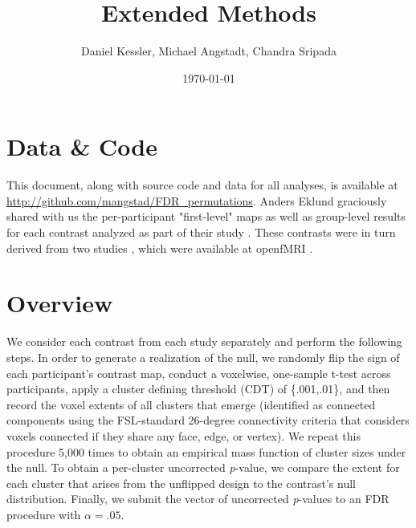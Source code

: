 \documentclass{article}
\author{Daniel Kessler, Michael Angstadt, Chandra Sripada}
\date{\today}
\title{Extended Methods}
\begin{document}
\maketitle

\section{Data \& Code}
This document, along with source code and data for all analyses, is available at \url{http://github.com/mangstad/FDR_permutations}.
Anders Eklund graciously shared with us the per-participant "first-level" maps as well as group-level results for each contrast analyzed as part of their study  \cite{eklund_cluster_2016}.
These contrasts were in turn derived from two studies \cite{duncan_consistency_2009,tom_neural_2007}, which were available at openfMRI \cite{poldrack_toward_2013}.


\section{Overview}
We consider each contrast from each study separately and perform the following steps.
In order to generate a realization of the null, we randomly flip the sign of each participant's contrast map, conduct a voxelwise, one-sample t-test across participants, apply a cluster defining threshold (CDT) of \{.001,.01\}, and then record the voxel extents of all clusters that emerge (identified as connected components using the FSL-standard 26-degree connectivity criteria that considers voxels connected if they share any face, edge, or vertex).
We repeat this procedure 5,000 times to obtain an empirical mass function of cluster sizes under the null.
To obtain a per-cluster uncorrected \textit{p}-value, we compare the extent for each cluster that arises from the unflipped design to the contrast's null distribution.
Finally, we submit the vector of uncorrected \textit{p}-values to an FDR procedure \cite{benjamini_controlling_1995} with $\alpha = .05$.
\end{document}
